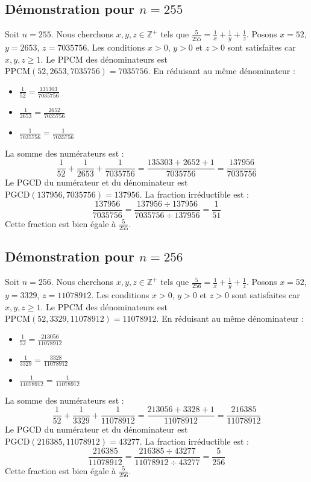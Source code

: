 \documentclass[11pt,a4paper]{article}
\begin{document}
\subsection{Démonstration pour $n = 255$}
Soit $n = 255$. Nous cherchons $x, y, z \in \mathbb{Z}^{+}$ tels que $\frac{5}{255} = \frac{1}{x} + \frac{1}{y} + \frac{1}{z}$.
Posons $x = 52$, $y = 2653$, $z = 7035756$.
Les conditions $x > 0$, $y > 0$ et $z > 0$ sont satisfaites car $x, y, z \geq 1$.
Le PPCM des dénominateurs est $\text{PPCM}(52, 2653, 7035756) = 7035756$.
En réduisant au même dénominateur :
\begin{itemize}
    \item $\frac{1}{52} = \frac{135303}{7035756}$
    \item $\frac{1}{2653} = \frac{2652}{7035756}$
    \item $\frac{1}{7035756} = \frac{1}{7035756}$
\end{itemize}
La somme des numérateurs est :
$$ \frac{1}{52} + \frac{1}{2653} + \frac{1}{7035756} = \frac{135303 + 2652 + 1}{7035756} = \frac{137956}{7035756} $$
Le PGCD du numérateur et du dénominateur est $\text{PGCD}(137956, 7035756) = 137956$.
La fraction irréductible est :
$$ \frac{137956}{7035756} = \frac{137956 \div 137956}{7035756 \div 137956} = \frac{1}{51} $$
Cette fraction est bien égale à $\frac{5}{255}$.

\subsection{Démonstration pour $n = 256$}
Soit $n = 256$. Nous cherchons $x, y, z \in \mathbb{Z}^{+}$ tels que $\frac{5}{256} = \frac{1}{x} + \frac{1}{y} + \frac{1}{z}$.
Posons $x = 52$, $y = 3329$, $z = 11078912$.
Les conditions $x > 0$, $y > 0$ et $z > 0$ sont satisfaites car $x, y, z \geq 1$.
Le PPCM des dénominateurs est $\text{PPCM}(52, 3329, 11078912) = 11078912$.
En réduisant au même dénominateur :
\begin{itemize}
    \item $\frac{1}{52} = \frac{213056}{11078912}$
    \item $\frac{1}{3329} = \frac{3328}{11078912}$
    \item $\frac{1}{11078912} = \frac{1}{11078912}$
\end{itemize}
La somme des numérateurs est :
$$ \frac{1}{52} + \frac{1}{3329} + \frac{1}{11078912} = \frac{213056 + 3328 + 1}{11078912} = \frac{216385}{11078912} $$
Le PGCD du numérateur et du dénominateur est $\text{PGCD}(216385, 11078912) = 43277$.
La fraction irréductible est :
$$ \frac{216385}{11078912} = \frac{216385 \div 43277}{11078912 \div 43277} = \frac{5}{256} $$
Cette fraction est bien égale à $\frac{5}{256}$.
\end{document}
